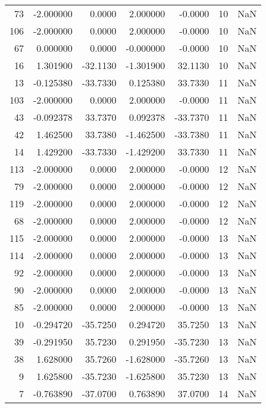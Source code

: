 \begin{tabular}{rrrrrrr}
 73 & -2.000000 &   0.0000 &  2.000000 &     -0.0000 &          10 & NaN \\
106 & -2.000000 &   0.0000 &  2.000000 &     -0.0000 &          10 & NaN \\
 67 &  0.000000 &   0.0000 & -0.000000 &     -0.0000 &          10 & NaN \\
 16 &  1.301900 & -32.1130 & -1.301900 &     32.1130 &          10 & NaN \\
 13 & -0.125380 & -33.7330 &  0.125380 &     33.7330 &          11 & NaN \\
103 & -2.000000 &   0.0000 &  2.000000 &     -0.0000 &          11 & NaN \\
 43 & -0.092378 &  33.7370 &  0.092378 &    -33.7370 &          11 & NaN \\
 42 &  1.462500 &  33.7380 & -1.462500 &    -33.7380 &          11 & NaN \\
 14 &  1.429200 & -33.7330 & -1.429200 &     33.7330 &          11 & NaN \\
113 & -2.000000 &   0.0000 &  2.000000 &     -0.0000 &          12 & NaN \\
 79 & -2.000000 &   0.0000 &  2.000000 &     -0.0000 &          12 & NaN \\
119 & -2.000000 &   0.0000 &  2.000000 &     -0.0000 &          12 & NaN \\
 68 & -2.000000 &   0.0000 &  2.000000 &     -0.0000 &          12 & NaN \\
115 & -2.000000 &   0.0000 &  2.000000 &     -0.0000 &          13 & NaN \\
114 & -2.000000 &   0.0000 &  2.000000 &     -0.0000 &          13 & NaN \\
 92 & -2.000000 &   0.0000 &  2.000000 &     -0.0000 &          13 & NaN \\
 90 & -2.000000 &   0.0000 &  2.000000 &     -0.0000 &          13 & NaN \\
 85 & -2.000000 &   0.0000 &  2.000000 &     -0.0000 &          13 & NaN \\
 10 & -0.294720 & -35.7250 &  0.294720 &     35.7250 &          13 & NaN \\
 39 & -0.291950 &  35.7230 &  0.291950 &    -35.7230 &          13 & NaN \\
 38 &  1.628000 &  35.7260 & -1.628000 &    -35.7260 &          13 & NaN \\
  9 &  1.625800 & -35.7230 & -1.625800 &     35.7230 &          13 & NaN \\
  7 & -0.763890 & -37.0700 &  0.763890 &     37.0700 &          14 & NaN \\

\end{tabular}
